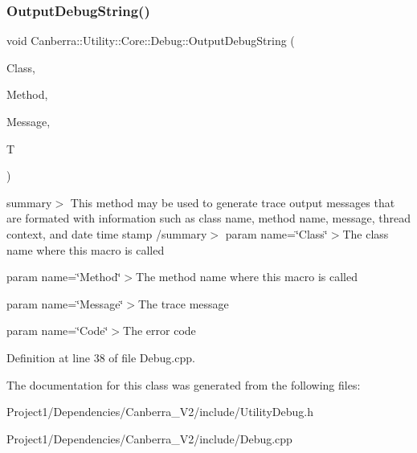 \subsubsection{\texorpdfstring{Output\+Debug\+String()}{OutputDebugString()}}
{\footnotesize\ttfamily void Canberra\+::\+Utility\+::\+Core\+::\+Debug\+::\+Output\+Debug\+String (\begin{DoxyParamCaption}\item[{const \hyperlink{class_canberra_1_1_utility_1_1_core_1_1_string}{String} \&}]{Class,  }\item[{const \hyperlink{class_canberra_1_1_utility_1_1_core_1_1_string}{String} \&}]{Method,  }\item[{const \hyperlink{class_canberra_1_1_utility_1_1_core_1_1_string}{String} \&}]{Message,  }\item[{Canberra\+::\+Utility\+::\+Core\+::\+Diagnostics\+::\+Trace\+Type}]{T }\end{DoxyParamCaption})\hspace{0.3cm}{\ttfamily [static]}}

summary$>$ This method may be used to generate trace output messages that are formated with information such as class name, method name, message, thread context, and date time stamp /summary$>$ param name=\char`\"{}\+Class\char`\"{}$>$The class name where this macro is called

param name=\char`\"{}\+Method\char`\"{}$>$The method name where this macro is called

param name=\char`\"{}\+Message\char`\"{}$>$The trace message

param name=\char`\"{}\+Code\char`\"{}$>$The error code

Definition at line 38 of file Debug.\+cpp.



The documentation for this class was generated from the following files\+:\begin{DoxyCompactItemize}
\item 
Project1/\+Dependencies/\+Canberra\+\_\+\+V2/include/Utility\+Debug.\+h\item 
Project1/\+Dependencies/\+Canberra\+\_\+\+V2/include/Debug.\+cpp\end{DoxyCompactItemize}
